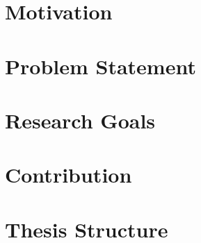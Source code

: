 \section{Motivation}

\section{Problem Statement}

\section{Research Goals}

\section{Contribution}

\section{Thesis Structure}